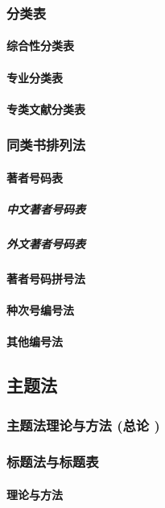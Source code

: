 \documentclass[UTF8]{../../ApplicationUniverse}
\begin{document}
        \subsubsection{分类表}
            \paragraph{综合性分类表}
            \paragraph{专业分类表}
            \paragraph{专类文献分类表}
        \subsubsection{同类书排列法}
            \paragraph{著者号码表}
                \subparagraph{中文著者号码表}
                \subparagraph{外文著者号码表}
            \paragraph{著者号码拼号法}
            \paragraph{种次号编号法}
            \paragraph{其他编号法}
    \subsection{主题法}
        \subsubsection{主题法理论与方法 (总论 )}
        \subsubsection{标题法与标题表}
            \paragraph{理论与方法}
\end{document}
